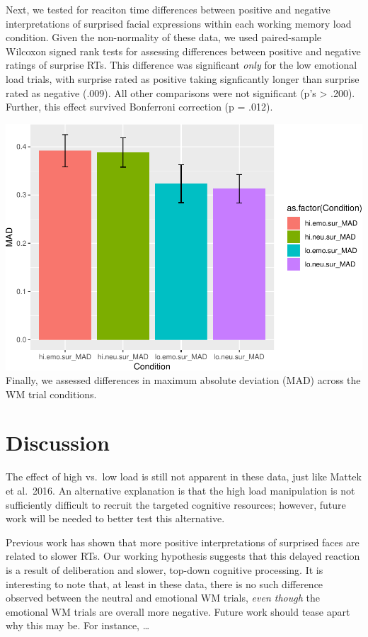 \documentclass[man]{apa6}
\begin{document}
Next, we tested for reaciton time differences between positive and negative interpretations of surprised facial expressions within each working memory load condition. Given the non-normality of these data, we used paired-sample Wilcoxon signed rank tests for assessing differences between positive and negative ratings of surprise RTs. This difference was significant \emph{only} for the low emotional load trials, with surprise rated as positive taking signficantly longer than surprise rated as negative (.009). All other comparisons were not significant (p's \textgreater{} .200). Further, this effect survived Bonferroni correction (p = .012).

\includegraphics{Manuscript_files/figure-latex/MAD plot-1.pdf}
Finally, we assessed differences in maximum absolute deviation (MAD) across the WM trial conditions.

\hypertarget{discussion}{%
\section{Discussion}\label{discussion}}

The effect of high vs.~low load is still not apparent in these data, just like Mattek et al.~2016. An alternative explanation is that the high load manipulation is not sufficiently difficult to recruit the targeted cognitive resources; however, future work will be needed to better test this alternative.

Previous work has shown that more positive interpretations of surprised faces are related to slower RTs. Our working hypothesis suggests that this delayed reaction is a result of deliberation and slower, top-down cognitive processing. It is interesting to note that, at least in these data, there is no such difference observed between the neutral and emotional WM trials, \emph{even though} the emotional WM trials are overall more negative. Future work should tease apart why this may be. For instance, \ldots{}
\end{document}
